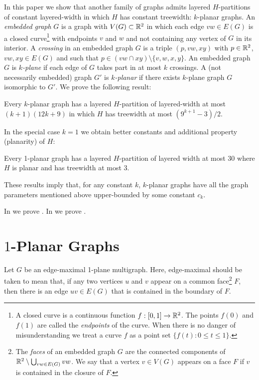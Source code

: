 \documentclass{patmorin}
\begin{document}
In this paper we show that another family of graphs admits layered $H$-partitions of constant layered-width in which $H$ has constant treewidth: $k$-planar graphs. An \emph{embedded graph} $G$ is a graph with $V(G)\subset\mathbb{R}^2$ in which each edge $vw\in E(G)$ is a closed curve\footnote{A closed curve is a continuous function $f:[0,1]\to \mathbb{R}^2$. The points $f(0)$ and $f(1)$ are called the \emph{endpoints} of the curve.  When there is no danger of misunderstanding we treat a curve $f$ as a point set $\{f(t):0\le t\le 1\}$.} with endpoints $v$ and $w$ and not containing any vertex of $G$ in its interior.  A \emph{crossing} in an embedded graph $G$ is a triple $(p,vw,xy)$ with $p\in\mathbb{R}^2$, $vw,xy\in E(G)$ and such that $p\in (vw\cap xy)\setminus\{v,w,x,y\}$. An embedded graph $G$ is \emph{$k$-plane} if each edge of $G$ takes part in at most $k$ crossings.  A (not necessarily embedded) graph $G'$ is \emph{$k$-planar} if there exists $k$-plane graph $G$ isomorphic to $G'$.  We prove the following result:

\begin{thm}
  Every $k$-planar graph has a layered $H$-partition of layered-width at most $(k+1)(12k + 9)$ in which $H$ has treewidth at most $(9^{k+1}-3)/2$.
\end{thm}

In the special case $k=1$ we obtain better constants and additional property (planarity) of $H$:

\begin{thm}
  Every 1-planar graph has a layered $H$-partition of layered width at most 30 where $H$ is planar and has treewidth at most 3.
\end{thm}

These results imply that, for any constant $k$, $k$-planar graphs have all the graph parameters mentioned above upper-bounded by some constant $c_k$.

In  we prove .  In  we prove .

\section{$1$-Planar Graphs}

Let $G$ be an edge-maximal 1-plane multigraph.  Here, edge-maximal should be taken to mean that, if any two vertices $u$ and $v$ appear on a common face\footnote{The \emph{faces} of an embedded graph $G$ are the connected components of $\mathbb{R}^2\setminus \bigcup_{vw\in E(G)} vw$.  We say that a vertex $v\in V(G)$ appears on a face $F$ if $v$ is contained in the closure of $F$.} $F$, then there is an edge $uv\in E(G)$ that is contained in the boundary of $F$.
\end{document}
